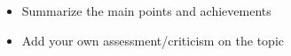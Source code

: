 \begin{itemize}
\item Summarize the main points and achievements
\item Add your own assessment/criticism on the topic
\end{itemize}